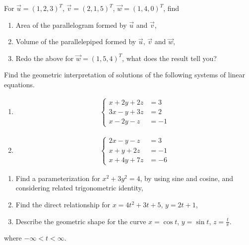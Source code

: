 \begin{Exercise}
For $\vec{u} = (1,2,3)^T$, $\vec{v} = (2,1,5)^T$, $\vec{w} = (1,4,0)^T$, find
\begin{enumerate}[label=(\alph*)]
\item Area of the parallelogram formed by $\vec{u}$ and $\vec{v}$,
\item Volume of the parallelepiped formed by $\vec{u}$, $\vec{v}$ and $\vec{w}$,
\item Redo the above for $\vec{w} = (1,5,4)^T$, what does the result tell you?
\end{enumerate}
\end{Exercise}

\begin{Exercise}
Find the geometric interpretation of solutions of the following systems of linear equations.
\begin{enumerate}[label=(\alph*)]
\item \begin{align*}
\begin{cases}
x + 2y + 2z &= 3\\
3x - y + 3z &= 2\\
x - 2y - z &= -1
\end{cases}
\end{align*}
\item
\begin{align*}
\begin{cases}
2x - y - z &= 3\\
x + y + 2z &= -1\\
x + 4y + 7z &= -6
\end{cases}
\end{align*}
\end{enumerate}
\end{Exercise}

\begin{Exercise}
\begin{enumerate}[label=(\alph*)]
\item Find a parameterization for $x^2 + 3y^2 = 4$, by using sine and cosine, and considering related trigonometric identity,
\item Find the direct relationship for $x = 4t^2 + 3t + 5$, $y = 2t + 1$,
\item Describe the geometric shape for the curve $x = \cos{t}$, $y = \sin{t}$, $z = \frac{t}{\pi}$.
\end{enumerate}
where $-\infty < t < \infty$.
\end{Exercise}